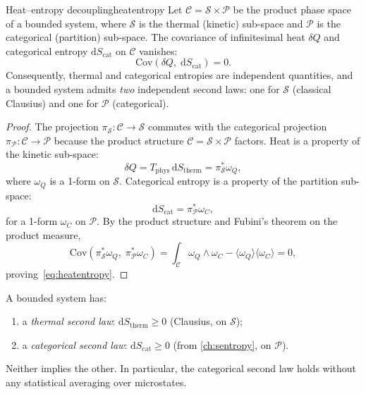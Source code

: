 \begin{consequence}{Heat--entropy decoupling}{heatentropy}
Let $\mathcal{C} = \mathcal{S} \times \mathcal{P}$ be the product phase
space of a bounded system, where $\mathcal{S}$ is the thermal (kinetic)
sub-space and $\mathcal{P}$ is the categorical (partition) sub-space.
The covariance of infinitesimal heat $\delta Q$ and categorical entropy
$\mathrm{d}S_{\mathrm{cat}}$ on $\mathcal{C}$ vanishes:
\begin{equation}
  \mathrm{Cov}(\delta Q,\;\mathrm{d}S_{\mathrm{cat}}) = 0.
  \label{eq:heatentropy}
\end{equation}
Consequently, thermal and categorical entropies are independent quantities,
and a bounded system admits \emph{two} independent second laws: one for
$\mathcal{S}$ (classical Clausius) and one for $\mathcal{P}$ (categorical).
\end{consequence}

\begin{proof}
The projection $\pi_{\mathcal{S}} : \mathcal{C} \to \mathcal{S}$ commutes
with the categorical projection
$\pi_{\mathcal{P}} : \mathcal{C} \to \mathcal{P}$
because the product structure $\mathcal{C} = \mathcal{S} \times \mathcal{P}$
factors.
Heat is a property of the kinetic sub-space:
\[
  \delta Q = T_{\mathrm{phys}}\,\mathrm{d}S_{\mathrm{therm}}
  = \pi_{\mathcal{S}}^*\omega_Q,
\]
where $\omega_Q$ is a 1-form on $\mathcal{S}$.
Categorical entropy is a property of the partition sub-space:
\[
  \mathrm{d}S_{\mathrm{cat}} = \pi_{\mathcal{P}}^*\omega_C,
\]
for a 1-form $\omega_C$ on $\mathcal{P}$.  By the product structure and
Fubini's theorem on the product measure,
\[
  \mathrm{Cov}
    \!\left(\pi_{\mathcal{S}}^*\omega_Q,\; \pi_{\mathcal{P}}^*\omega_C\right)
  = \int_{\mathcal{C}} \omega_Q \wedge \omega_C
    - \langle\omega_Q\rangle\langle\omega_C\rangle
  = 0,
\]
proving~\eqref{eq:heatentropy}.
\end{proof}

\begin{corollary}
\label{cor:twosecondlaws}
A bounded system has:
\begin{enumerate}[nosep, label=(\roman*)]
  \item a \emph{thermal second law}: $\mathrm{d}S_{\mathrm{therm}} \ge 0$
    (Clausius, on $\mathcal{S}$);
  \item a \emph{categorical second law}: $\mathrm{d}S_{\mathrm{cat}} \ge 0$
    (from \cref{ch:sentropy}, on $\mathcal{P}$).
\end{enumerate}
Neither implies the other.  In particular, the categorical second law holds
without any statistical averaging over microstates.
\end{corollary}

